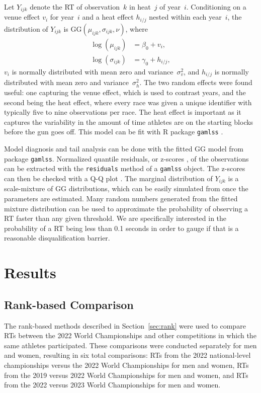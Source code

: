 \documentclass[12pt, letterpaper]{article}
\begin{document}
Let $Y_{ijk}$ denote the RT of observation~$k$ in heat~$j$
of year~$i$. Conditioning on a venue effect $v_i$ for year~$i$
and a heat effect $h_{i/j}$ nested within each year~$i$, the
distribution of $Y_{ijk}$ is
$\text{GG}(\mu_{ijk}, \sigma_{ijk}, \nu)$, where
\begin{align}
\log(\mu_{ijk}) &= \beta_0 + v_i , \label{eq:mu}\\
\log(\sigma_{ijk}) &= \gamma_0 + h_{i/j} , \label{eq:sigma}
\end{align}
$v_i$ is normally distributed with mean zero and
variance~$\sigma_v^2$, and $h_{i/j}$ is normally distributed with mean
zero and variance~$\sigma_h^2$.
The two random effects were found useful: one capturing the venue effect, which
is used to contrast years, and the second being the heat effect, where every
race was given a unique identifier with typically five to nine observations
per race. The heat effect is important as it captures the variability in the
amount of time athletes are on the starting blocks before the gun goes off.
This model can be fit with R package \texttt{gamlss}
\citep{stasinopoulos2008generalized}.


Model diagnosis and tail analysis can be done with the fitted GG model
from package \texttt{gamlss}. Normalized quantile residuals, or
z-scores \citep{dunn1996randomized}, of the observations can be
extracted with the \texttt{residuals} method of a \texttt{gamlss}
object. The z-scores can then be checked with a Q-Q plot
\citep{almeida2018ggplot2}. The marginal
distribution of $Y_{ijk}$ is a scale-mixture of GG distributions, which can be
easily simulated from once the parameters are estimated. Many
random numbers generated from the fitted mixture distribution can be used to
approximate the probability of observing a RT faster than any given
threshold. We are specifically interested in the probability of a RT
being less than 0.1 seconds in order to gauge if that is a reasonable
disqualification barrier.



\section{Results} \label{sec:Results}

\subsection{Rank-based Comparison} \label{subsec:Results_Rank}

The rank-based methods described in Section~\ref{sec:rank} were used to
compare RTs between the 2022 World Championships and other
competitions in which the same athletes participated. These comparisons
were conducted separately for men and women, resulting in six total
comparisons: RTs from the 2022 national-level championships
versus the 2022 World Championships for men and women, RTs
from the 2019 versus 2022 World Championships for men and women, and
RTs from the 2022 versus 2023 World Championships for men and
women.
\end{document}
